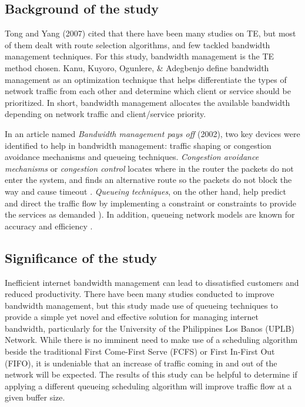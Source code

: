 \documentclass[journal]{IEEE/IEEEtran}
\begin{document}
\subsection{Background of the study}
Tong and Yang (2007)\cite{tong_yang_2007} cited that there have been many studies on TE, but most of them dealt with route selection algorithms, and few tackled bandwidth management techniques. For this study, bandwidth management is the TE method chosen. Kanu, Kuyoro, Ogunlere, \& Adegbenjo \cite{kanu_kuyoro_ogunlere_adegbenjo_2012} define bandwidth management as an optimization technique that helps differentiate the types of network traffic from each other and determine which client or service should be prioritized. In short, bandwidth management allocates the available bandwidth depending on network traffic and client/service priority.

In an article named \textit{Bandwidth management pays off} (2002)\cite{communication_news_2001}, two key devices were identified to help in bandwidth management: traffic shaping or congestion avoidance mechanisms and queueing techniques. \textit{Congestion avoidance mechanisms} or \textit{congestion control} locates where in the router the packets do not enter the system, and finds an alternative route so the packets do not block the way and cause timeout \cite{jacobson_1988}. \textit{Queueing techniques}, on the other hand, help predict and direct the traffic flow by implementing a constraint or constraints to provide the services as demanded \cite{gross_harris_1974}). In addition, queueing network models are known for accuracy and efficiency \cite{lazowska_zahorjan_graham_sevcik_1984}.

\subsection{Significance of the study}
Inefficient internet bandwidth management can lead to dissatisfied customers and reduced productivity. There have been many studies conducted to improve bandwidth management, but this study made use of queueing techniques to provide a simple yet novel and effective solution for managing internet bandwidth, particularly for the University of the Philippines Los Banos (UPLB) Network. While there is no imminent need to make use of a scheduling algorithm beside the traditional First Come-First Serve (FCFS) or First In-First Out (FIFO), it is undeniable that an increase of traffic coming in and out of the network will be expected. The results of this study can be helpful to determine if applying a different queueing scheduling algorithm will improve traffic flow at a given buffer size.
\end{document}
